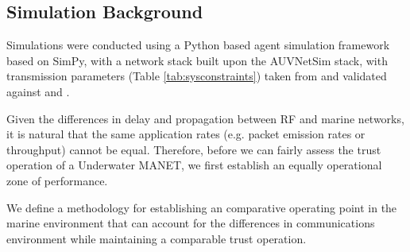 \documentclass[runningheads,a4paper]{llncs}
\begin{document}
\subsection{Simulation Background}

Simulations were conducted using a Python based agent simulation framework based on SimPy\cite{Mueller2003SimPy}, with a network stack built upon the AUVNetSim stack\cite{Miquel2008}, with transmission parameters (Table \ref{tab:sysconstraints}) taken from and validated against \cite{Stojanovic2007} and \cite{Stefanov2011}.

Given the differences in delay and propagation between RF and marine networks, it is natural that the same application rates (e.g. packet emission rates or throughput) cannot be equal.
Therefore, before we can fairly assess the trust operation of a Underwater MANET, we first establish an equally operational zone of performance.

We define a methodology for establishing an comparative operating point in the marine environment that can account for the differences in communications environment while maintaining a comparable trust operation.
\end{document}
